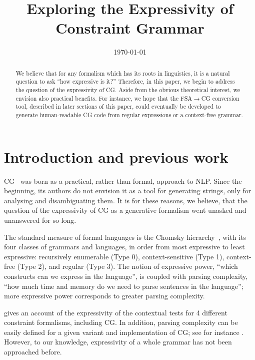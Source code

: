 \documentclass[11pt]{article}
\title{Exploring the Expressivity of Constraint Grammar}
\date{\today}
\begin{document}
\maketitle

\begin{abstract}
  We believe that for any formalism which has its roots in linguistics, it is a
  natural question to ask ``how expressive is it?'' Therefore, in this paper, we
  begin to address the question of the expressivity of CG.
  Aside from the obvious theoretical interest, we envision also practical
  benefits. For instance, we hope that the FSA$\rightarrow$CG conversion tool, described in
  later sections of this paper, could eventually be developed to generate
  human-readable CG code from regular expressions or a context-free grammar. 
\end{abstract}

\section{Introduction and previous work}

CG~\cite{karlsson1995constraint} was born as a practical, rather than formal, 
approach to NLP. 
Since the beginning, its authors do not envision it as a tool for 
generating strings, only for analysing and disambiguating them.
It is for these reasons, we believe, that the question of the expressivity of CG
as a generative formalism went unasked and unanswered for so long.

The standard measure of formal languages is the Chomsky
hierarchy~\cite{chomsky1956hierarchy}, with its four classes of grammars and
languages, in order from most expressive to least expressive: recursively
enumerable (Type 0), context-sensitive (Type 1), context-free (Type 2), and
regular (Type 3). The notion of expressive power, ``which constructs can we
express in the language'', is coupled with parsing complexity, ``how much time
and memory do we need to parse sentences in the language''; more expressive
power corresponds to greater parsing complexity.


 gives an account of the expressivity of
the contextual tests for 4 different constraint formalisms, including CG. 
In addition, parsing complexity can be easily defined for a given variant and 
implementation of CG; see for instance .
However, to our knowledge, expressivity of a whole grammar has not been approached before.
\end{document}
